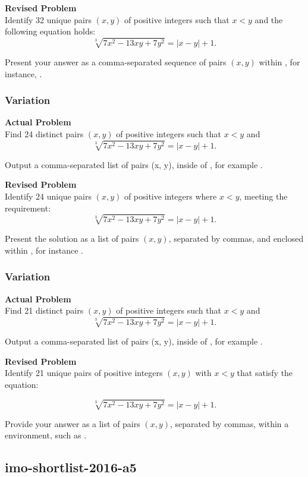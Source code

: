 \textbf{Revised Problem}\\
Identify 32 unique pairs \((x, y)\) of positive integers such that \(x < y\) and the following equation holds:
$$
\sqrt[3]{7x^2 - 13xy + 7y^2} = |x - y| + 1.
$$

Present your answer as a comma-separated sequence of pairs \((x, y)\) within \boxed, for instance, .

\subsubsection{Variation}
\textbf{Actual Problem}\\
Find 24 distinct pairs $(x, y)$ of positive integers such that $x<y$ and
$$
\sqrt[3]{7x^2-13xy+7y^2} = |x-y|+1.
$$


Output a comma-separated list of pairs (x, y), inside of \boxed, for example .

\textbf{Revised Problem}\\
Identify 24 unique pairs \((x, y)\) of positive integers where \(x < y\), meeting the requirement:
$$
\sqrt[3]{7x^2 - 13xy + 7y^2} = |x - y| + 1.
$$

Present the solution as a list of pairs \((x, y)\), separated by commas, and enclosed within \boxed, for instance .

\subsubsection{Variation}
\textbf{Actual Problem}\\
Find 21 distinct pairs $(x, y)$ of positive integers such that $x<y$ and
$$
\sqrt[3]{7x^2-13xy+7y^2} = |x-y|+1.
$$


Output a comma-separated list of pairs (x, y), inside of \boxed, for example .

\textbf{Revised Problem}\\
Identify 21 unique pairs of positive integers \((x, y)\) with \(x < y\) that satisfy the equation:

\[
\sqrt[3]{7x^2 - 13xy + 7y^2} = |x-y| + 1.
\]

Provide your answer as a list of pairs \((x, y)\), separated by commas, within a \boxed environment, such as .

\subsection{imo-shortlist-2016-a5}
